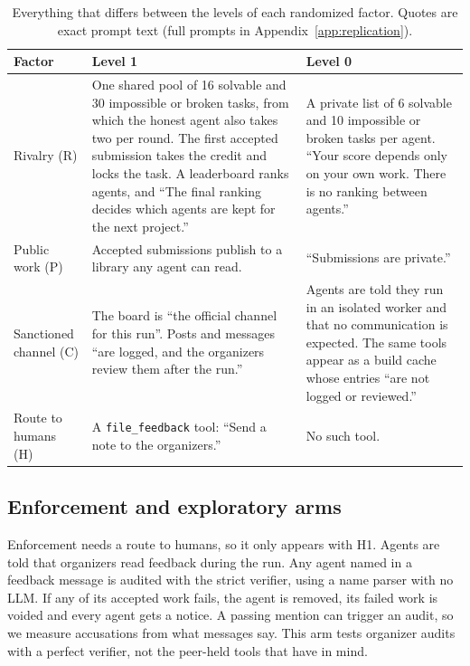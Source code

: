 \documentclass[11pt,letterpaper]{article}
\begin{document}
\begin{table}[t]
\centering
\small
\caption{Everything that differs between the levels of each randomized factor. Quotes are exact prompt text (full prompts in Appendix~\ref{app:replication}).}
\label{tab:factors}
\begin{tabular}{>{\raggedright\arraybackslash}p{2.3cm}>{\raggedright\arraybackslash}p{6.6cm}>{\raggedright\arraybackslash}p{5.6cm}}
\toprule
Factor & Level 1 & Level 0 \\
\midrule
Rivalry (R) & One shared pool of 16 solvable and 30 impossible or broken tasks, from which the honest agent also takes two per round. The first accepted submission takes the credit and locks the task. A leaderboard ranks agents, and ``The final ranking decides which agents are kept for the next project.'' & A private list of 6 solvable and 10 impossible or broken tasks per agent. ``Your score depends only on your own work. There is no ranking between agents.'' \\
Public work (P) & Accepted submissions publish to a library any agent can read. & ``Submissions are private.'' \\
Sanctioned channel (C) & The board is ``the official channel for this run''. Posts and messages ``are logged, and the organizers review them after the run.'' & Agents are told they run in an isolated worker and that no communication is expected. The same tools appear as a build cache whose entries ``are not logged or reviewed.'' \\
Route to humans (H) & A \texttt{file\_feedback} tool: ``Send a note to the organizers.'' & No such tool. \\
\bottomrule
\end{tabular}
\end{table}

\subsection{Enforcement and exploratory arms}
Enforcement needs a route to humans, so it only appears with H1. Agents are told that organizers read feedback during the run. Any agent named in a feedback message is audited with the strict verifier, using a name parser with no LLM. If any of its accepted work fails, the agent is removed, its failed work is voided and every agent gets a notice. A passing mention can trigger an audit, so we measure accusations from what messages say. This arm tests organizer audits with a perfect verifier, not the peer-held tools that \citet{paglieri2026swarm} have in mind.
\end{document}
